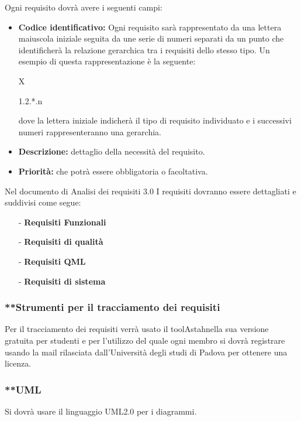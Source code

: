 \documentclass[a4paper,11pt]{article}
\begin{document}
			Ogni requisito dovrà avere i seguenti campi:
			\begin{itemize}
			\item \textbf{Codice identificativo:} 
			Ogni requisito sarà rappresentato da una lettera maiuscola iniziale seguita da une serie di numeri separati da un punto che identificherà la relazione gerarchica tra i requisiti dello stesso tipo. Un esempio di questa rappresentazione è la seguente:
					\begin{center}
					\begin{Large} X\end{Large}  \begin{normalsize}1.2.*.n	\end{normalsize}					
					\end{center}
					dove la lettera iniziale indicherà il tipo di requisito individuato e i successivi numeri rappresenteranno una gerarchia.					
			
			\item \textbf{Descrizione:} dettaglio della necessità del requisito.
			\item \textbf{Priorità:} che potrà essere obbligatoria o facoltativa.
			\end{itemize}
			Nel documento di Analisi dei requisiti 3.0
			I requisiti dovranno essere dettagliati  e suddivisi come segue:
			\begin{itemize}
			\item[-] \textbf{Requisiti Funzionali}
			\item[-] \textbf{Requisiti di qualità}
			\item[-] \textbf{Requisiti QML}
			\item[-] \textbf{Requisiti di sistema}
			\end{itemize}

	
			\subsubsection{ **Strumenti per il tracciamento dei requisiti}
			Per il tracciamento dei requisiti verrà usato il tool\addglos Astah\addglos nella sua versione gratuita per studenti e per l'utilizzo del quale ogni membro si dovrà registrare usando la mail rilasciata dall'Università degli studi di Padova per ottenere una licenza.  
			\subsubsection{ **UML}
			Si dovrà usare il linguaggio UML2.0 per i diagrammi.
\end{document}
